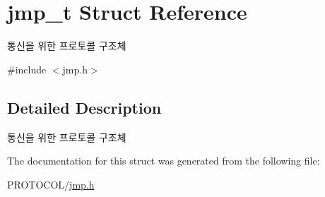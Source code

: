 \hypertarget{structjmp__t}{\section{jmp\-\_\-t Struct Reference}
\label{structjmp__t}
}


통신을 위한 프로토콜 구조체  




{\ttfamily \#include $<$jmp.\-h$>$}



\subsection{Detailed Description}
통신을 위한 프로토콜 구조체 

The documentation for this struct was generated from the following file\-:\begin{DoxyCompactItemize}
\item 
P\-R\-O\-T\-O\-C\-O\-L/\hyperlink{jmp_8h}{jmp.\-h}\end{DoxyCompactItemize}
